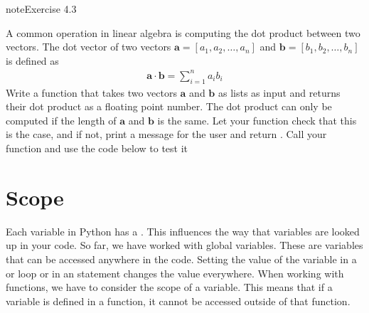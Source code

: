 \documentclass[letterpaper,10pt,english]{jupyterBook}
\begin{document}
\begin{sphinxadmonition}{note}{Exercise 4.3}

\sphinxAtStartPar
A common operation in linear algebra is computing the dot product between two vectors. The dot vector of two vectors \(\mathbf{a}=[a_1, a_2, \ldots, a_n]\) and \(\mathbf{b}=[b_1, b_2, \ldots, b_n]\) is defined as
\begin{equation*}
\begin{split}\mathbf{a} \cdot \mathbf{b} = \sum_{i=1}^n a_i b_i\end{split}
\end{equation*}
\sphinxAtStartPar
Write a function that takes two vectors \(\mathbf{a}\) and \(\mathbf{b}\) as lists as input and returns their dot product as a floating point number. The dot product can only be computed if the length of \(\mathbf{a}\) and \(\mathbf{b}\) is the same. Let your function check that this is the case, and if not, print a message for the user and return . Call your function  and use the code below to test it

\begin{sphinxVerbatim}[commandchars=\\\{\}]
  \PYG{p}{[}  \PYG{p}{]}
  \PYG{p}{[}  \PYG{p}{]}
 

  \PYG{p}{[}   \PYG{p}{]}
  \PYG{p}{[}  \PYG{p}{]}
 
\end{sphinxVerbatim}
\end{sphinxadmonition}


\section{Scope}
\label{\detokenize{notebooks/04_Functions/04_Functions_student:scope}}
\sphinxAtStartPar
Each variable in Python has a . This influences the way that variables are looked up in your code. So far, we have worked with global variables. These are variables that can be accessed anywhere in the code. Setting the value of the variable in a  or  loop or in an \sphinxhyphen{}statement changes the value everywhere. When working with functions, we have to consider the scope of a variable. This means that if a variable is defined in a function, it cannot be accessed outside of that function.
\end{document}

